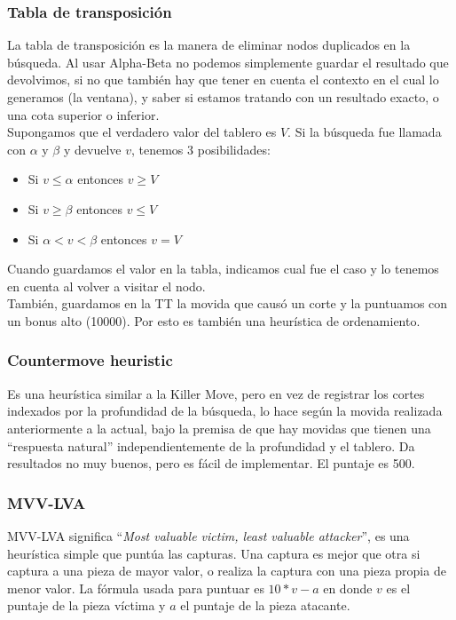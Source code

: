 \documentclass{article}
\begin{document}
\begin{multicols}{2}
\subsubsection{Tabla de transposición}
La tabla de transposición es la manera de eliminar nodos duplicados
en la búsqueda. Al usar Alpha-Beta no podemos simplemente guardar el
resultado que devolvimos, si no que también hay que tener en cuenta
el contexto en el cual lo generamos (la ventana), y saber si estamos
tratando con un resultado exacto, o una cota superior o inferior.
\\

Supongamos que el verdadero valor del tablero es $V$. Si la búsqueda
fue llamada con $\alpha$ y $\beta$ y devuelve $v$, tenemos 3
posibilidades:

\begin{itemize}
\item Si $v \le \alpha$ entonces $v \ge V$
\item Si $v \ge \beta$ entonces $v \le V$
\item Si $\alpha < v < \beta$ entonces $v = V$
\end{itemize}

Cuando guardamos el valor en la tabla, indicamos cual fue el caso y lo
tenemos en cuenta al volver a visitar el nodo.
\\

También, guardamos en la TT la movida que causó un corte y la
puntuamos con un bonus alto (10000). Por esto es también una
heurística de ordenamiento.

\subsubsection{Countermove heuristic}
Es una heurística similar a la Killer Move, pero en vez de registrar
los cortes indexados por la profundidad de la búsqueda, lo hace según
la movida realizada anteriormente a la actual, bajo la premisa de que
hay movidas que tienen una ``respuesta natural'' independientemente de
la profundidad y el tablero. Da resultados no muy buenos, pero es fácil
de implementar. El puntaje es 500.

\subsubsection{MVV-LVA}
MVV-LVA significa ``\emph{Most valuable victim, least valuable
attacker}'', es una heurística simple que puntúa las capturas. Una
captura es mejor que otra si captura a una pieza de mayor valor, o
realiza la captura con una pieza propia de menor valor. La fórmula
usada para puntuar es $10*v - a$ en donde $v$ es el puntaje de la pieza
víctima y $a$ el puntaje de la pieza atacante.
\\


\end{multicols}
\end{document}
